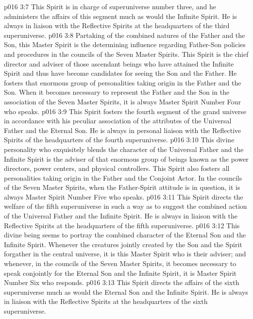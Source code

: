 \vs p016 3:7 This Spirit is in charge of superuniverse number three, and he administers the affairs of this segment much as would the Infinite Spirit. He is always in liaison with the Reflective Spirits at the headquarters of the third superuniverse.
\pc \vs p016 3:8  Partaking of the combined natures of the Father and the Son, this Master Spirit is the determining influence regarding Father\hyp{}Son policies and procedures in the councils of the Seven Master Spirits. This Spirit is the chief director and adviser of those ascendant beings who have attained the Infinite Spirit and thus have become candidates for seeing the Son and the Father. He fosters that enormous group of personalities taking origin in the Father and the Son. When it becomes necessary to represent the Father and the Son in the association of the Seven Master Spirits, it is always Master Spirit Number Four who speaks.
\vs p016 3:9 This Spirit fosters the fourth segment of the grand universe in accordance with his peculiar association of the attributes of the Universal Father and the Eternal Son. He is always in personal liaison with the Reflective Spirits of the headquarters of the fourth superuniverse.
\pc \vs p016 3:10  This divine personality who exquisitely blends the character of the Universal Father and the Infinite Spirit is the adviser of that enormous group of beings known as the power directors, power centers, and physical controllers. This Spirit also fosters all personalities taking origin in the Father and the Conjoint Actor. In the councils of the Seven Master Spirits, when the Father\hyp{}Spirit attitude is in question, it is always Master Spirit Number Five who speaks.
\vs p016 3:11 This Spirit directs the welfare of the fifth superuniverse in such a way as to suggest the combined action of the Universal Father and the Infinite Spirit. He is always in liaison with the Reflective Spirits at the headquarters of the fifth superuniverse.
\pc \vs p016 3:12  This divine being seems to portray the combined character of the Eternal Son and the Infinite Spirit. Whenever the creatures jointly created by the Son and the Spirit forgather in the central universe, it is this Master Spirit who is their adviser; and whenever, in the councils of the Seven Master Spirits, it becomes necessary to speak conjointly for the Eternal Son and the Infinite Spirit, it is Master Spirit Number Six who responds.
\vs p016 3:13 This Spirit directs the affairs of the sixth superuniverse much as would the Eternal Son and the Infinite Spirit. He is always in liaison with the Reflective Spirits at the headquarters of the sixth superuniverse.
